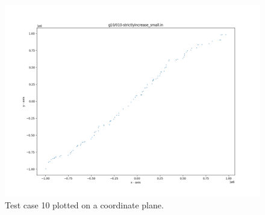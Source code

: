\documentclass{article}
\begin{document}
\begin{appendices}
\begin{figure}[H]
	\includegraphics[scale=0.5]{code/visualizer/testdata/10.png}
	\caption{Test case 10 plotted on a coordinate plane.}
	\label{fig:10}
\end{figure}


\end{appendices}
\end{document}
